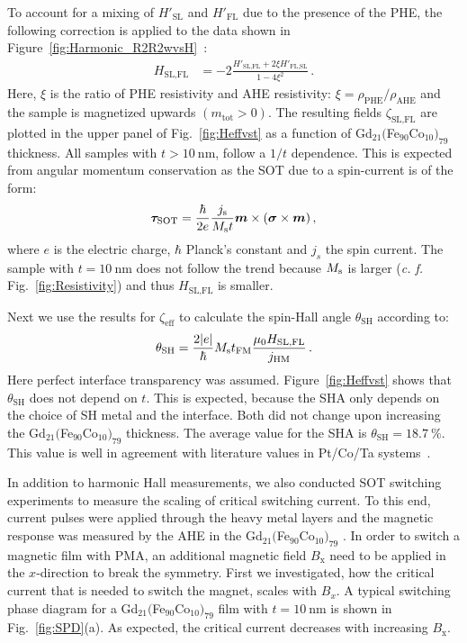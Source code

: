 \documentclass[aps,prb,superscriptaddress,sd,reprint]{revtex4-1}
\newcommand{\GdFeCo}{Gd$_{21}($Fe$_{90}$Co$_{10})_{79}$ }
\begin{document}
%
%
To account for a mixing of $H'_\text{SL}$ and $H'_\text{FL}$ due to the presence of the PHE, the following correction is applied to the data shown in Figure~\ref{fig:Harmonic_R2R2wvsH}~\cite{Hayashi2014}:
\begin{align}
H_\text{SL,FL}&=-2 \frac{H'_\text{SL,FL}+ 2 \xi H'_\text{FL,SL}}{1-4\xi^2}\label{eq:EffectiveField}\, .
\end{align}
Here, $\xi$ is the ratio of PHE resistivity and AHE resistivity: $\xi=\rho_\text{PHE}/\rho_\text{AHE}$ and the sample is magnetized upwards $(m_\text{tot}>0)$. The resulting fields $\zeta_\text{SL,FL}$ are plotted in the upper panel of Fig.~\ref{fig:Heffvst} as a function of \GdFeCo thickness. All samples with $t>\SI{10}{\nano\meter}$, follow a $1/t$ dependence. This is expected from angular momentum conservation as the SOT due to a spin-current is of the form:
\begin{align}
\bm\tau_\text{SOT}=\frac{\hbar}{2e}\frac{j_\text s}{M_\text s t}\bm m\times(\bm\sigma\times \bm m)\, ,\label{eq:torque}
\end{align}
where $e$ is the electric charge, $\hbar$ Planck's constant and $j_s$ the spin current. The sample with $t=\SI{10}{\nano\meter}$ does not follow the trend because $M_\text s$ is larger (\textit{c. f.} Fig.~\ref{fig:Resistivity}) and thus $H_\text{SL,FL}$ is smaller.

Next we use the results for $\zeta_\text{eff}$ to calculate the spin-Hall angle $\theta_\text{SH}$ according to:
\begin{align}
\theta_\text{SH}=\frac{2|e|}{\hbar}M_\text s t_\text{FM} \frac{\mu_0 H_\text{SL,FL}}{j_\text{HM}}\, .\label{eq:SHA}
\end{align}
Here perfect interface transparency was assumed. Figure~\ref{fig:Heffvst} shows that $\theta_\text{SH}$ does not depend on $t$. This is expected, because the SHA only depends on the choice of SH metal and the interface. Both did not change upon increasing the \GdFeCo thickness. The average value for the SHA is $\theta_\text{SH}=\SI{18.7}{\percent}$. This value is well in agreement with literature values in Pt/Co/Ta systems~\cite{Woo2014}.

In addition to harmonic Hall measurements, we also conducted SOT switching experiments to measure the scaling of critical switching current. To this end, current pulses were applied through the heavy metal layers and the magnetic response was measured by the AHE in the \GdFeCo. In order to switch a magnetic film with PMA, an additional magnetic field $B_\text{x}$ need to be applied in the $x$-direction to break the symmetry. First we investigated, how the critical current that is needed to switch the magnet, scales with $B_{x}$. A typical switching phase diagram for a \GdFeCo film with $t=\SI{10}{\nano\meter}$ is shown in Fig.~\ref{fig:SPD}(a). As expected, the critical current decreases with increasing $B_\text{x}$.
\end{document}
